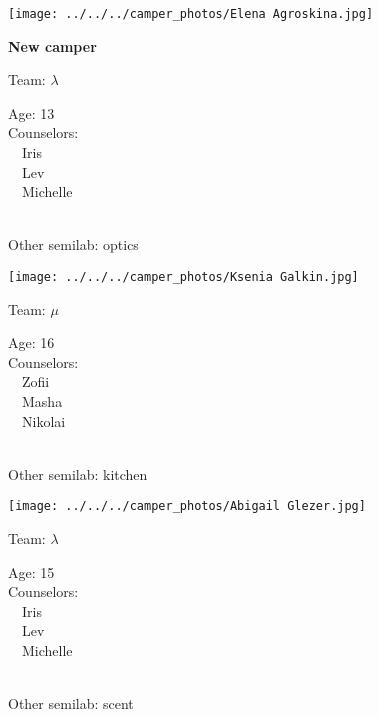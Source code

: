 \documentclass[10pt,letterpaper, landscape]{article}
\begin{document}
\horizontalshiftfornextsticker
\renewcommand{\baselinestretch}{1} \begin{sticker}
\noindent\begin{minipage}{0.5\textwidth}\texttt{[image: ../../../camper\_photos/Elena Agroskina.jpg]}\end{minipage}\begin{minipage}{0.45\textwidth}
\textbf{New camper} 

Team: {\Large $\lambda$}

Age:        13\\
Counselors: \\\ \ Iris\\\ \ Lev\\\ \ Michelle\\
\end{minipage} \\ \vspace{0.07in}
Other semilab: optics
\end{sticker}
\horizontalshiftfornextsticker
\renewcommand{\baselinestretch}{1} \begin{sticker}
\noindent\begin{minipage}{0.5\textwidth}\texttt{[image: ../../../camper\_photos/Ksenia Galkin.jpg]}\end{minipage}\begin{minipage}{0.45\textwidth}
Team: {\Large $\mu$}

Age:        16\\
Counselors: \\\ \ Zofii\\\ \ Masha\\\ \ Nikolai\\
\end{minipage} \\ \vspace{0.07in}
Other semilab: kitchen
\end{sticker}
\horizontalshiftfornextsticker
\renewcommand{\baselinestretch}{1} \begin{sticker}
\noindent\begin{minipage}{0.5\textwidth}\texttt{[image: ../../../camper\_photos/Abigail Glezer.jpg]}\end{minipage}\begin{minipage}{0.45\textwidth}
Team: {\Large $\lambda$}

Age:        15\\
Counselors: \\\ \ Iris\\\ \ Lev\\\ \ Michelle\\
\end{minipage} \\ \vspace{0.07in}
Other semilab: scent
\end{sticker}
\end{document}
